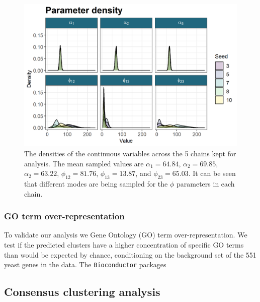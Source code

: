 \documentclass[]{article}
\begin{document}
\begin{figure}
	\centering
	\includegraphics[scale=1]{../Images/Yeast/densityPlotReduced.png}
	\caption{The densities of the continuous variables across the 5 chains kept for analysis. The mean sampled values are $\alpha_1= 64.84$, $\alpha_2 = 69.85$, $\alpha_2 = 63.22$, $\phi_{12} = 81.76$, $\phi_{13} = 13.87$, and $\phi_{23} = 65.03$. It can be seen that different modes are being sampled for the $\phi$ parameters in each chain.
	}
	\label{fig:bayesDensities}
\end{figure}

\subsubsection{GO term over-representation}
To validate our analysis we Gene Ontology (GO) term over-representation. We test if the predicted clusters have a higher concentration of specific GO terms than would be expected by chance, conditioning on the background set of the 551 yeast genes in the data. The \texttt{Bioconductor} packages \texttt{}

\subsection{Consensus clustering analysis}




%

  
\end{document}
